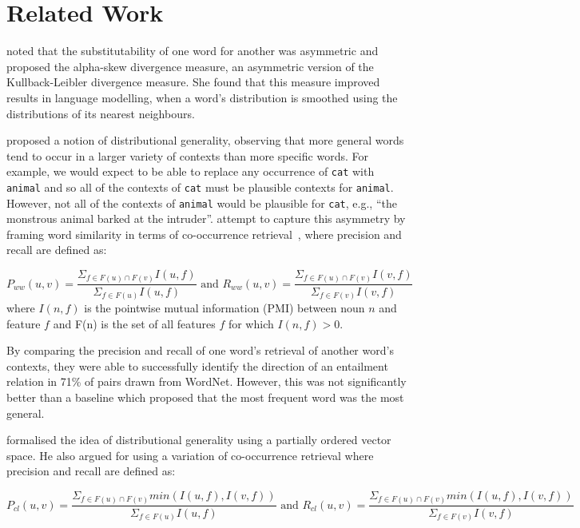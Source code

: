 \documentclass[11pt]{article}
\begin{document}
\section{Related Work}
\label{sect:relwork}

 noted that the substitutability of one word for another was asymmetric and proposed the alpha-skew divergence measure, an asymmetric version of the Kullback-Leibler divergence measure.  She found that this measure improved results in language modelling, when a word's distribution is smoothed using the distributions of its nearest neighbours.

 proposed a notion of distributional generality, observing that more general words tend to occur in a larger variety of contexts than more specific words.  For example, we would expect to be able to replace any occurrence of \texttt{cat} with \texttt{animal} and so all of the contexts of \texttt{cat} must be plausible contexts for \texttt{animal}.  However, not all of the contexts of \texttt{animal} would be plausible for \texttt{cat}, e.g., ``the monstrous animal barked at the intruder''.   attempt to capture this asymmetry by framing word similarity in terms of co-occurrence retrieval~\cite{Weeds2003}, where precision and recall are defined as:

\[
P_{ww}(u,v) = \frac{\Sigma_{f \in F(u) \cap F(v)} I(u,f)}{\Sigma_{f \in F(u)} I(u,f)} \textrm{ and } 
R_{ww}(u,v) = \frac{\Sigma_{f \in F(u) \cap F(v)} I(v,f)}{\Sigma_{f \in F(v)} I(v,f)}
\]
where $I(n,f)$ is the  pointwise mutual information (PMI) between noun $n$ and feature $f$ and F(n) is the set of all features $f$ for which $I(n,f)>0$.

By comparing the precision and recall of one word's retrieval of another word's contexts, they were able to successfully identify the direction of an entailment relation in 71\% of pairs drawn from WordNet.  However, this was not significantly better than a baseline which proposed that the most frequent word was the most general.

 formalised the idea of distributional generality using a partially ordered vector space.  He also argued for using a variation of co-occurrence retrieval where precision and recall are defined as:

\[
P_{cl}(u,v) = \frac{\Sigma_{f \in F(u) \cap F(v)} min(I(u,f),I(v,f))}{\Sigma_{f \in F(u)} I(u,f)} \textrm{ and }
R_{cl}(u,v) = \frac{\Sigma_{f \in F(u) \cap F(v)} min(I(u,f),I(v,f))}{\Sigma_{f \in F(v)} I(v,f)}
\]
\end{document}
